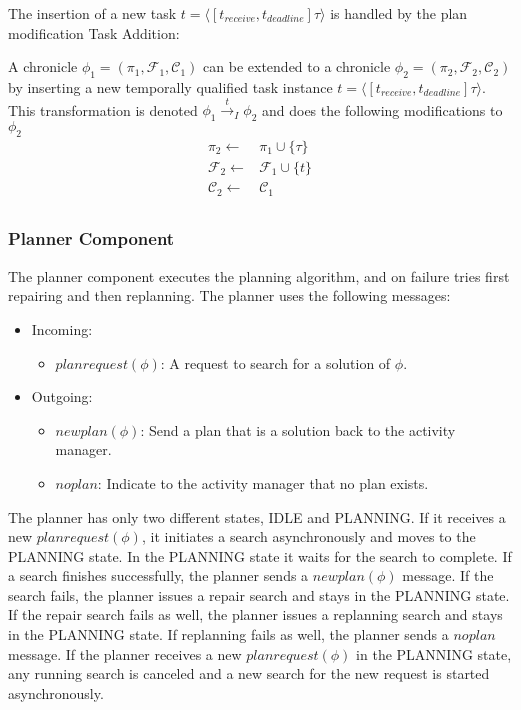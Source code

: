 The insertion of a new task $t = \langle[t_{receive},t_{deadline}] \tau\rangle$ is handled by the plan modification Task Addition:

\begin{definition}
    A chronicle $\phi_1 = (\pi_1,\mathcal{F}_1,\mathcal{C}_1)$ can be extended to a chronicle $\phi_2 = (\pi_2,\mathcal{F}_2,\mathcal{C}_2)$ by inserting a new temporally qualified task instance $t = \langle[t_{receive},t_{deadline}] \tau\rangle$. This transformation is denoted $\phi_1 \xrightarrow{t}_I \phi_2$ and does the following modifications to $\phi_2$
  \begin{align*}
    \pi_2 \leftarrow & \pi_1 \cup \{\tau\} \\
    \mathcal{F}_2 \leftarrow & \mathcal{F}_1 \cup \{t\} \\
    \mathcal{C}_2 \leftarrow & \mathcal{C}_1 \\
  \end{align*}
\end{definition}

\subsubsection{Planner Component}

The planner component executes the planning algorithm, and on failure tries first repairing and then replanning.
The planner uses the following messages:

\begin{itemize}
    \item Incoming:
    \begin{itemize}
        \item $planrequest(\phi)$: A request to search for a solution of $\phi$.
    \end{itemize}
    \item Outgoing:
    \begin{itemize}
        \item $newplan(\phi)$: Send a plan that is a solution back to the activity manager.
        \item $noplan$: Indicate to the activity manager that no plan exists.
    \end{itemize}
\end{itemize}

The planner has only two different states, IDLE and PLANNING.
If it receives a new $planrequest(\phi)$, it initiates a search asynchronously and moves to the PLANNING state.
In the PLANNING state it waits for the search to complete.
If a search finishes successfully, the planner sends a $newplan(\phi)$ message.
If the search fails, the planner issues a repair search and stays in the PLANNING state.
If the repair search fails as well, the planner issues a replanning search and stays in the PLANNING state.
If replanning fails as well, the planner sends a $noplan$ message.
If the planner receives a new $planrequest(\phi)$ in the PLANNING state, any running search is canceled and a new search for the new request is started asynchronously.

